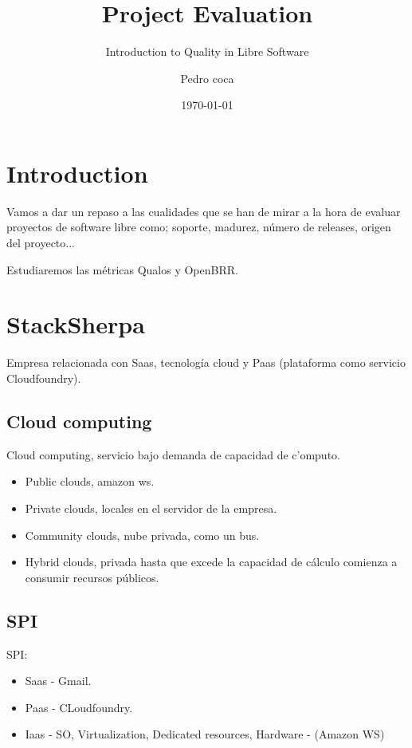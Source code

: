 \documentclass[11pt]{scrartcl}
\title{\textbf{Project Evaluation}}
\subtitle{Introduction to Quality in Libre Software}
\author{Pedro coca}
\date{\today}
\begin{document}
\maketitle

\section{Introduction}

Vamos a dar un repaso a las cualidades que se han de mirar a la hora de evaluar proyectos de software libre como; soporte, madurez, número de releases, origen del proyecto...

Estudiaremos las métricas Qualos y OpenBRR.

\section{StackSherpa}

Empresa relacionada con Saas, tecnología cloud y Paas (plataforma como servicio Cloudfoundry).

\subsection{Cloud computing}

Cloud computing, servicio bajo demanda de capacidad de c'omputo.

\begin{itemize}
    \item Public clouds, amazon ws.
    \item Private clouds, locales en el servidor de la empresa.
    \item Community clouds, nube privada, como un bus.
    \item Hybrid clouds, privada hasta que excede la capacidad de c\'alculo comienza a consumir recursos p\'ublicos.
\end{itemize}

\subsection{SPI}

SPI:
\begin{itemize}
    \item Saas - Gmail.
    \item Paas - CLoudfoundry.
    \item Iaas - SO, Virtualization, Dedicated resources, Hardware - (Amazon WS)
\end{itemize}
\end{document}
